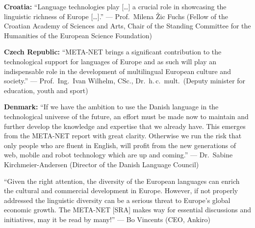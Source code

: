 \documentclass[10pt, plain]{../../metanetpaper}
\begin{document}
\maketitle

\cleardoublepage

\makefundingnotice

\cleardoublepage



\textbf{Croatia:} ``Language technologies play [\dots] a crucial role in showcasing the linguistic richness of Europe [\dots].'' --- Prof.~Milena Žic Fuchs (Fellow of the Croatian Academy of Sciences and Arts, Chair of the Standing Committee for the Humanities of the European Science Foundation)

\medskip \textbf{Czech Republic:} ``META-NET brings a significant contribution to the technological support for languages of Europe and as such will play an indispensable role in the development of multilingual European culture and society.'' --- Prof.~Ing.~Ivan Wilhelm, CSc., Dr.~h.\,c.~mult.~(Deputy minister for education, youth and sport)

\medskip \textbf{Denmark:} ``If we have the ambition to use the Danish language in the technological universe of the future, an effort must be made now to maintain and further develop the knowledge and expertise that we already have. This emerges from the META-NET report with great clarity. Otherwise we run the risk that only people who are fluent in English, will profit from the new generations of web, mobile and robot technology which are up and coming.'' --- Dr.~Sabine Kirchmeier-Andersen (Director of the Danish Language Council)

\medskip ``Given the right attention, the diversity of the European languages can enrich the cultural and commercial development in Europe.  However, if not properly addressed the linguistic diversity can be a serious threat to Europe’s global economic growth. The META-NET [SRA] makes way for essential discussions and initiatives, may it be read by many!'' --- Bo Vincents (CEO, Ankiro)

\end{document}

